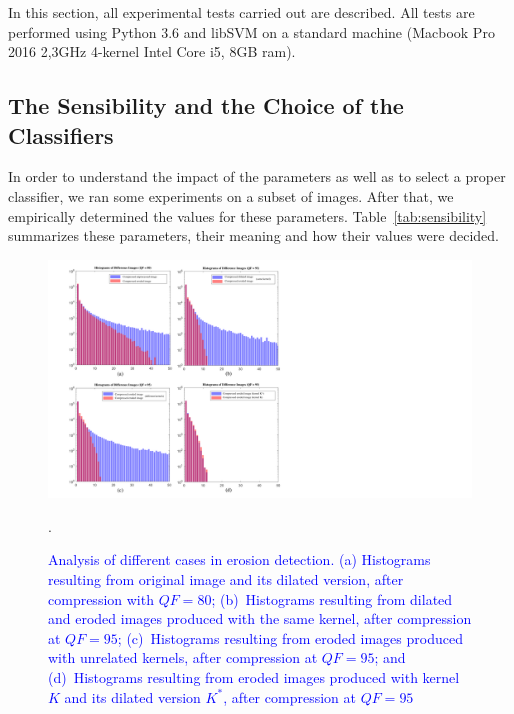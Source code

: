 \documentclass{ieeeaccess}
\begin{document}
In this section, all experimental tests carried out are described. 
All  tests are performed using Python 3.6 and libSVM on a standard machine (Macbook Pro 2016 2,3GHz 4-kernel Intel Core i5, 8GB ram).

\subsection{The Sensibility and the Choice of the Classifiers}
\label{subsec:sensibity}

In order to understand the impact of the parameters as well as to select a proper classifier, we ran some experiments on a subset of images. After that, we empirically determined the values for these parameters. Table~\ref{tab:sensibility} summarizes these parameters, their meaning and how their values were decided.
\begin{figure}[h!]
	\centering
	\includegraphics[width=0.8\linewidth]{morp_cases}
	\caption{\textcolor{blue}{Analysis of different cases in erosion detection. (a) Histograms resulting from  original image and its dilated version, after compression with $QF= 80$; (b)~Histograms resulting from dilated and eroded images produced with the same kernel, after compression at $QF=95$;
		(c)~Histograms resulting from eroded images produced with unrelated kernels, after compression at $QF=95$; and
		(d)~Histograms resulting from eroded images produced with kernel $K$ and its dilated version $K^*$, after compression at $QF=95$}}.
	\label{fig:morp_cases}
\end{figure}
\end{document}
